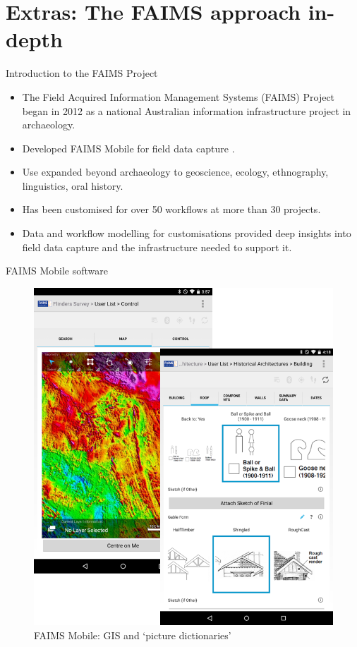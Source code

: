 \documentclass[aspectratio=169, 12pt]{beamer} %
\begin{document}
\section{Extras: The FAIMS approach in-depth}

\begin{frame}{Introduction to the FAIMS Project}
    \begin{itemize}[label=\textbullet]
        \item The Field Acquired Information Management Systems (FAIMS) Project began in 2012 as a national Australian information infrastructure project in archaeology.
        \item Developed FAIMS Mobile for field data capture \cite{Ballsun-Stanton2018-zd}.
        \item Use expanded beyond archaeology to geoscience, ecology, ethnography, linguistics, oral history.
        \item Has been customised for over 50 workflows at more than 30 projects. 
        \item Data and workflow modelling for customisations provided deep insights into field data capture and the infrastructure needed to support it.
    \end{itemize}
\end{frame}

\begin{frame}{FAIMS Mobile software}
 \begin{figure}[H]
    \centering
        \includegraphics[height=.75\textheight]{figures/FAIMS-screenshots.png}
        \caption{FAIMS Mobile: GIS and `picture dictionaries'}
        \label{fig:figure10}
 \end{figure}
\end{frame}
\end{document}

